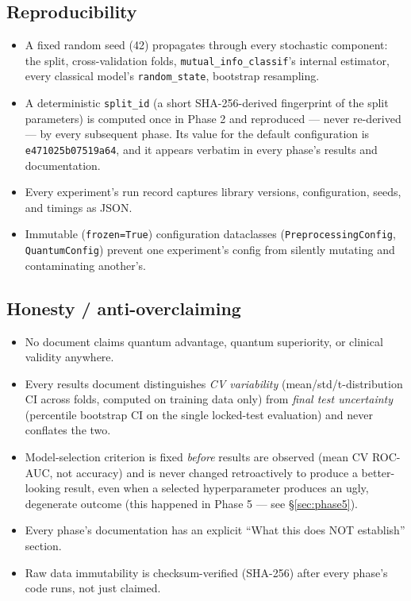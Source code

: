 \documentclass[11pt,a4paper]{article}
\newcommand{\code}[1]{\texttt{\small #1}}
\begin{document}
\subsection{Reproducibility}
\begin{itemize}[leftmargin=1.4em]
  \item A fixed random seed (42) propagates through every stochastic component: the split, cross-validation folds, \code{mutual\_info\_classif}'s internal estimator, every classical model's \code{random\_state}, bootstrap resampling.
  \item A deterministic \code{split\_id} (a short SHA-256-derived fingerprint of the split parameters) is computed once in Phase 2 and reproduced --- never re-derived --- by every subsequent phase. Its value for the default configuration is \code{e471025b07519a64}, and it appears verbatim in every phase's results and documentation.
  \item Every experiment's run record captures library versions, configuration, seeds, and timings as JSON.
  \item Immutable (\code{frozen=True}) configuration dataclasses (\code{PreprocessingConfig}, \code{QuantumConfig}) prevent one experiment's config from silently mutating and contaminating another's.
\end{itemize}

\subsection{Honesty / anti-overclaiming}
\begin{itemize}[leftmargin=1.4em]
  \item No document claims quantum advantage, quantum superiority, or clinical validity anywhere.
  \item Every results document distinguishes \emph{CV variability} (mean/std/t-distribution CI across folds, computed on training data only) from \emph{final test uncertainty} (percentile bootstrap CI on the single locked-test evaluation) and never conflates the two.
  \item Model-selection criterion is fixed \emph{before} results are observed (mean CV ROC-AUC, not accuracy) and is never changed retroactively to produce a better-looking result, even when a selected hyperparameter produces an ugly, degenerate outcome (this happened in Phase 5 --- see \S\ref{sec:phase5}).
  \item Every phase's documentation has an explicit ``What this does NOT establish'' section.
  \item Raw data immutability is checksum-verified (SHA-256) after every phase's code runs, not just claimed.
\end{itemize}
\end{document}
